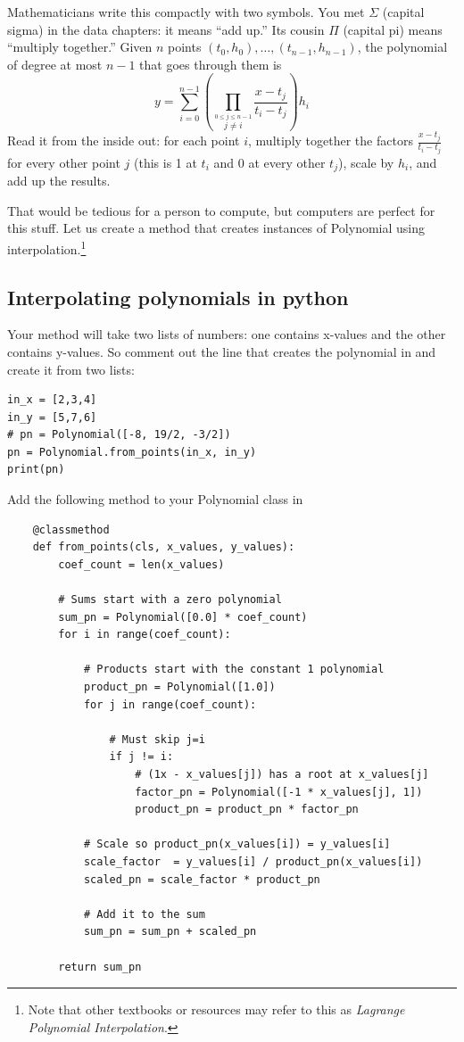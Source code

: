 Mathematicians write this compactly with two symbols. You met $\Sigma$
(capital sigma) in the data chapters: it means ``add up.'' Its cousin
$\Pi$ (capital pi) means ``multiply together.'' Given $n$ points
$(t_0, h_0), \ldots, (t_{n-1}, h_{n-1})$, the polynomial of degree at
most $n-1$ that goes through them is
\begin{equation*}
  y =\sum_{i=0}^{n-1}\left ( \prod_{\stackrel{\!0\leq j\leq n-1}{j\neq i}}\frac{x-t_j}{t_i-t_j}\right ) h_i
\end{equation*}
Read it from the inside out: for each point $i$, multiply together the
factors $\frac{x - t_j}{t_i - t_j}$ for every other point $j$ (this is 1
at $t_i$ and 0 at every other $t_j$), scale by $h_i$, and add up the
results.

That would be tedious for a person to compute, but computers are perfect for this
stuff. Let us create a method that creates instances of Polynomial
using interpolation.\footnote{Note that other textbooks or resources may refer to this as \textit{Lagrange Polynomial Interpolation}.}

\subsection{Interpolating polynomials in python}

Your method will take two lists of numbers: one contains x-values and
the other contains y-values. So comment out the line that creates the
polynomial in  and create it from two lists:
\begin{verbatim}
in_x = [2,3,4]
in_y = [5,7,6]
# pn = Polynomial([-8, 19/2, -3/2])
pn = Polynomial.from_points(in_x, in_y)
print(pn)
\end{verbatim}

Add the following method to your Polynomial class in 
\begin{verbatim}
    @classmethod
    def from_points(cls, x_values, y_values):
        coef_count = len(x_values)

        # Sums start with a zero polynomial
        sum_pn = Polynomial([0.0] * coef_count)
        for i in range(coef_count):

            # Products start with the constant 1 polynomial
            product_pn = Polynomial([1.0])
            for j in range(coef_count):

                # Must skip j=i
                if j != i:
                    # (1x - x_values[j]) has a root at x_values[j]
                    factor_pn = Polynomial([-1 * x_values[j], 1])
                    product_pn = product_pn * factor_pn
                    
            # Scale so product_pn(x_values[i]) = y_values[i]
            scale_factor  = y_values[i] / product_pn(x_values[i])
            scaled_pn = scale_factor * product_pn

            # Add it to the sum
            sum_pn = sum_pn + scaled_pn
            
        return sum_pn  
\end{verbatim}

